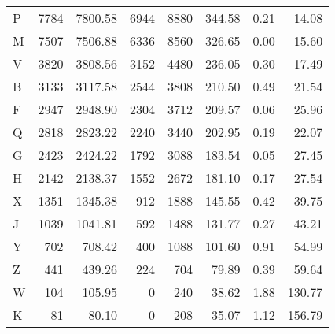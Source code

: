 \begin{tabular}{lrrrrrrr}
     P &          7784 &           7800.58 &              6944 &              8880 &              344.58 &                    0.21 &                   14.08 \\
     M &          7507 &           7506.88 &              6336 &              8560 &              326.65 &                    0.00 &                   15.60 \\
     V &          3820 &           3808.56 &              3152 &              4480 &              236.05 &                    0.30 &                   17.49 \\
     B &          3133 &           3117.58 &              2544 &              3808 &              210.50 &                    0.49 &                   21.54 \\
     F &          2947 &           2948.90 &              2304 &              3712 &              209.57 &                    0.06 &                   25.96 \\
     Q &          2818 &           2823.22 &              2240 &              3440 &              202.95 &                    0.19 &                   22.07 \\
     G &          2423 &           2424.22 &              1792 &              3088 &              183.54 &                    0.05 &                   27.45 \\
     H &          2142 &           2138.37 &              1552 &              2672 &              181.10 &                    0.17 &                   27.54 \\
     X &          1351 &           1345.38 &               912 &              1888 &              145.55 &                    0.42 &                   39.75 \\
     J &          1039 &           1041.81 &               592 &              1488 &              131.77 &                    0.27 &                   43.21 \\
     Y &           702 &            708.42 &               400 &              1088 &              101.60 &                    0.91 &                   54.99 \\
     Z &           441 &            439.26 &               224 &               704 &               79.89 &                    0.39 &                   59.64 \\
     W &           104 &            105.95 &                 0 &               240 &               38.62 &                    1.88 &                  130.77 \\
     K &            81 &             80.10 &                 0 &               208 &               35.07 &                    1.12 &                  156.79 \\
\bottomrule
\end{tabular}
